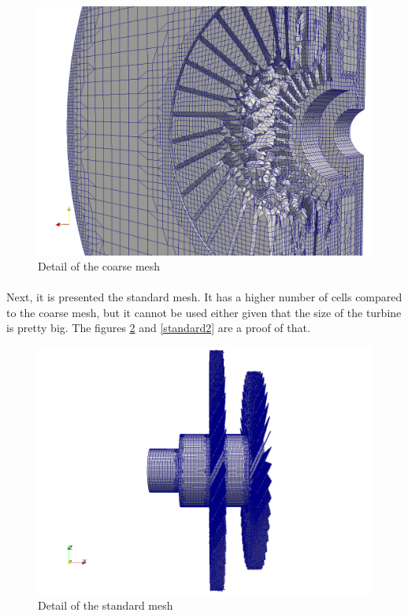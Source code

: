 \begin{figure}[h!]
\includegraphics[scale=0.25]{./mesh/newmesh/coarse19}
\centering
\caption{Detail of the coarse mesh}
\label{coarse2}
\end{figure}

\newpage{}

\paragraph{}Next, it is presented the standard mesh. It has a higher number of cells compared to the coarse mesh, but it cannot be used either given that the size of the turbine is pretty big. The figures \ref{standard1} and \ref{standard2} are a proof of that.

\begin{figure}[h!]
\includegraphics[scale=0.24]{./mesh/newmesh/std1}
\centering
\caption{Detail of the standard mesh}
\label{standard1}
\end{figure}

